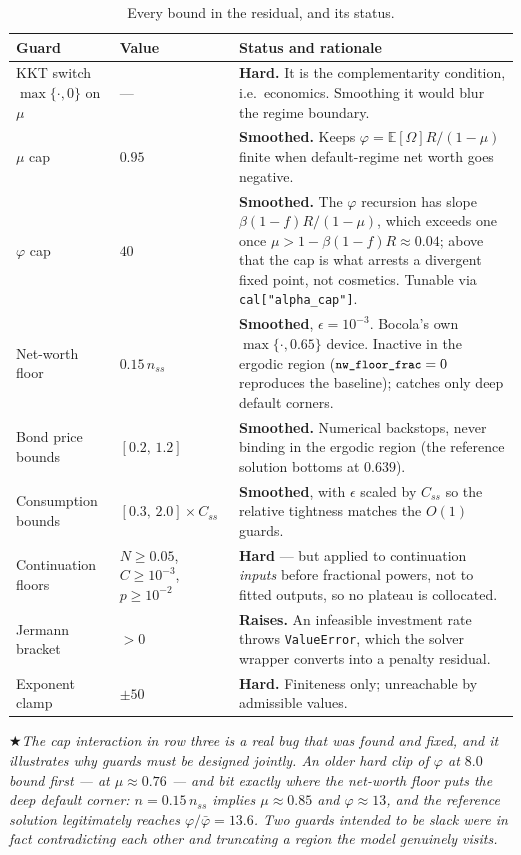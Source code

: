 \documentclass[11pt]{article}
\numberwithin{equation}{section}
\newcommand{\E}{\mathbb{E}}
\newcommand{\code}[1]{\texttt{\small #1}}
\theoremstyle{definition}
\theoremstyle{plain}
\theoremstyle{remark}
\newcommand{\warn}[1]{\par\smallskip\noindent
  \textcolor{red!60!black}{$\bigstar$}\;\emph{#1}\par\smallskip}
\begin{document}
\begin{table}[htbp]
\centering\small
\caption{Every bound in the residual, and its status.}
\label{tab:guards}
\begin{tabular}{@{}>{\raggedright\arraybackslash}p{2.9cm}l>{\raggedright\arraybackslash}p{7.5cm}@{}}
\toprule
Guard & Value & Status and rationale \\
\midrule
KKT switch $\max\{\cdot,0\}$ on $\mu$ & --- &
\textbf{Hard.} It is the complementarity condition, i.e.\ economics. Smoothing it
would blur the regime boundary. \\
$\mu$ cap & $0.95$ &
\textbf{Smoothed.} Keeps $\varphi=\E[\Omega]R/(1-\mu)$ finite when default-regime net
worth goes negative. \\
$\varphi$ cap & $40$ &
\textbf{Smoothed.} The $\varphi$ recursion has slope $\beta(1-f)R/(1-\mu)$, which
exceeds one once $\mu>1-\beta(1-f)R\approx0.04$; above that the cap is what arrests a
divergent fixed point, not cosmetics. Tunable via \code{cal["alpha\_cap"]}. \\
Net-worth floor & $0.15\,n_{ss}$ &
\textbf{Smoothed}, $\epsilon=10^{-3}$. Bocola's own $\max\{\cdot,0.65\}$ device.
Inactive in the ergodic region ($\code{nw\_floor\_frac}=0$ reproduces the baseline);
catches only deep default corners. \\
Bond price bounds & $[0.2,\,1.2]$ &
\textbf{Smoothed.} Numerical backstops, never binding in the ergodic region (the
reference solution bottoms at $0.639$). \\
Consumption bounds & $[0.3,\,2.0]\times C_{ss}$ &
\textbf{Smoothed}, with $\epsilon$ scaled by $C_{ss}$ so the relative tightness
matches the $O(1)$ guards. \\
Continuation floors & $N\ge0.05$, $C\ge10^{-3}$, $p\ge10^{-2}$ &
\textbf{Hard} --- but applied to continuation \emph{inputs} before fractional powers,
not to fitted outputs, so no plateau is collocated. \\
Jermann bracket & $>0$ &
\textbf{Raises.} An infeasible investment rate throws \code{ValueError}, which the
solver wrapper converts into a penalty residual. \\
Exponent clamp & $\pm50$ &
\textbf{Hard.} Finiteness only; unreachable by admissible values. \\
\bottomrule
\end{tabular}
\end{table}

\warn{The cap interaction in row three is a real bug that was found and fixed, and it
illustrates why guards must be designed jointly. An older hard clip of $\varphi$ at
$8.0$ bound \emph{first} --- at $\mu\approx0.76$ --- and bit exactly where the
net-worth floor puts the deep default corner: $n=0.15\,n_{ss}$ implies
$\mu\approx0.85$ and $\varphi\approx13$, and the reference solution legitimately
reaches $\varphi/\bar\varphi=13.6$. Two guards intended to be slack were in fact
contradicting each other and truncating a region the model genuinely visits.}
\end{document}
